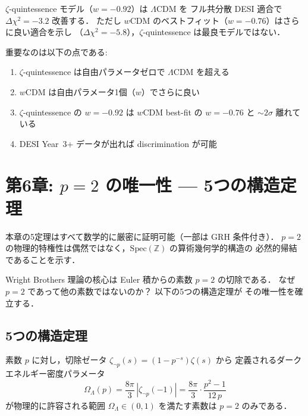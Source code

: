 \begin{keyresult}
$\zeta$-quintessence モデル（$w = -0.92$）は $\Lambda$CDM を
フル共分散 DESI 適合で $\Delta\chi^2 = -3.2$ 改善する．
ただし $w$CDM のベストフィット（$w = -0.76$）はさらに良い適合を示し
（$\Delta\chi^2 = -5.8$），$\zeta$-quintessence は最良モデルではない．

重要なのは以下の点である:
\begin{enumerate}
\item $\zeta$-quintessence は自由パラメータゼロで $\Lambda$CDM を超える
\item $w$CDM は自由パラメータ1個（$w$）でさらに良い
\item $\zeta$-quintessence の $w = -0.92$ は $w$CDM best-fit の $w = -0.76$ と
  $\sim2\sigma$ 離れている
\item DESI Year~3+ データが出れば discrimination が可能
\end{enumerate}
\end{keyresult}

\newpage
\section{第6章: $p=2$ の唯一性 — 5つの構造定理}

\begin{statusbox}
本章の5定理はすべて数学的に厳密に証明可能（一部は GRH 条件付き）．
$p=2$ の物理的特権性は偶然ではなく，$\mathrm{Spec}(\mathbb{Z})$ の算術幾何学的構造の
必然的帰結であることを示す．
\end{statusbox}

Wright Brothers 理論の核心は Euler 積からの素数 $p=2$ の切除である．
なぜ $p=2$ であって他の素数ではないのか？ 以下の5つの構造定理が
その唯一性を確立する．

\subsection{5つの構造定理}

\begin{theorem}[物理的有界性]
素数 $p$ に対し，切除ゼータ $\zeta_{\neg p}(s) = (1-p^{-s})\zeta(s)$ から
定義されるダークエネルギー密度パラメータ
\begin{equation}
\Omega_\Lambda(p) = \frac{8\pi}{3}\,|\zeta_{\neg p}(-1)|
= \frac{8\pi}{3}\cdot\frac{p^2-1}{12\,p}
\end{equation}
が物理的に許容される範囲 $\Omega_\Lambda \in (0,1)$ を満たす素数は
$p = 2$ のみである．
\end{theorem}


